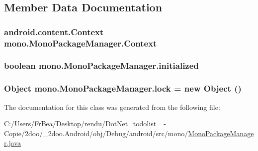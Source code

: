 \subsection{Member Data Documentation}
\hypertarget{classmono_1_1_mono_package_manager_5fdce295817dc558ee9bd80970675ad3}{
\subsubsection[{Context}]{\setlength{\rightskip}{0pt plus 5cm}android.content.Context {\bf mono.MonoPackageManager.Context}}}
\label{classmono_1_1_mono_package_manager_5fdce295817dc558ee9bd80970675ad3}


\hypertarget{classmono_1_1_mono_package_manager_f696e39741e83da48e302adfa1cf119a}{
\subsubsection[{initialized}]{\setlength{\rightskip}{0pt plus 5cm}boolean {\bf mono.MonoPackageManager.initialized}}}
\label{classmono_1_1_mono_package_manager_f696e39741e83da48e302adfa1cf119a}


\hypertarget{classmono_1_1_mono_package_manager_4d06b1faa61973f874252c5de3f42ce3}{
\subsubsection[{lock}]{\setlength{\rightskip}{0pt plus 5cm}Object {\bf mono.MonoPackageManager.lock} = new Object ()}}
\label{classmono_1_1_mono_package_manager_4d06b1faa61973f874252c5de3f42ce3}




The documentation for this class was generated from the following file:\begin{CompactItemize}
\item 
C:/Users/FrBea/Desktop/rendu/DotNet\_\-todolist\_ - Copie/2doo/\_\-2doo.Android/obj/Debug/android/src/mono/\hyperlink{_mono_package_manager_8java}{MonoPackageManager.java}\end{CompactItemize}
